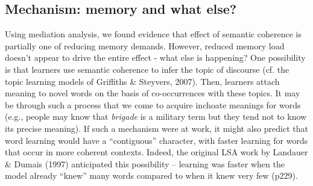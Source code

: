 \documentclass[man,floatsintext]{apa6}
\begin{document}

\subsection{Mechanism: memory and what else?}

Using mediation analysis, we found evidence that effect of semantic
coherence is partially one of reducing memory demands. However,
reduced memory load doesn't appear to drive the entire effect - what
else is happening? One possibility is that learners use semantic
coherence to infer the topic of discourse (cf. the topic learning
models of Griffiths \& Steyvers, 2007). Then, learners attach meaning
to novel words on the basis of co-occurrences with these topics. It
may be through such a process that we come to acquire inchoate
meanings for words (e.g., people may know that \emph{brigade} is a
military term but they tend not to know its precise meaning). If such
a mechanism were at work, it might also predict that word learning
would have a ``contiguous'' character, with faster learning for words
that occur in more coherent contexts. Indeed, the original LSA work by
Landauer \& Dumais (1997) anticipated this possibility -- learning was
faster when the model already ``knew'' many words compared to when it
knew very few (p229).


\nocite{*} \newpage 

\end{document}
